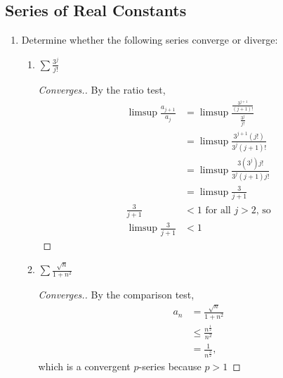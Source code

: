 \documentclass{article}
\begin{document}
\subsection{Series of Real Constants}
\begin{enumerate}
      \item Determine whether the following series converge
            or diverge:
            \begin{enumerate}
                  \item $\sum\frac{3^j}{j!}$
                        \begin{proof}[Converges.]
                              By the ratio test,
                              \begin{align*}
                                    \limsup \frac{a_{j+1}}{a_j} & = \limsup \frac{\frac{3^{j+1}}{(j+1)!}}{\frac{3^j}{j!}} \\
                                                                & = \limsup \frac{3^{j+1}(j!)}{3^j(j+1)!}                 \\
                                                                & = \limsup \frac{3(3^j)j!}{3^j(j+1)j!}                   \\
                                                                & = \limsup \frac{3}{j+1}                                 \\
                                    \frac{3}{j+1}               & < 1 \textrm{ for all $j>2$, so}                         \\
                                    \limsup \frac{3}{j+1}       & < 1
                              \end{align*}
                        \end{proof}
                  \item $\sum\frac{\sqrt{n}}{1+n^2}$
                        \begin{proof}[Converges.]
                              By the comparison test,
                              \begin{align*}
                                    a_n & = \frac{\sqrt{n}}{1+n^2}       \\
                                        & \leq \frac{n^\frac{1}{2}}{n^2} \\
                                        & = \frac{1}{n^\frac{3}{2}},
                              \end{align*}
                              which is a convergent $p$-series because $p>1$
                        \end{proof}

\end{enumerate}
\end{enumerate}
\end{document}
